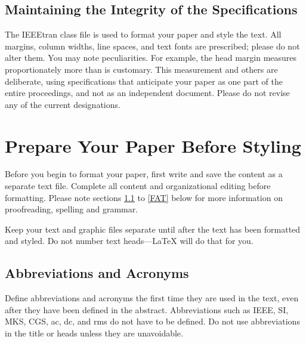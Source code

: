 \documentclass[conference]{IEEEtran}
\begin{document}
    \subsection{Maintaining the Integrity of the Specifications}

    The IEEEtran class file is used to format your paper and style the text. All margins, 
    column widths, line spaces, and text fonts are prescribed; please do not 
    alter them. You may note peculiarities. For example, the head margin
    measures proportionately more than is customary. This measurement 
    and others are deliberate, using specifications that anticipate your paper 
    as one part of the entire proceedings, and not as an independent document. 
    Please do not revise any of the current designations.

    \section{Prepare Your Paper Before Styling}
    Before you begin to format your paper, first write and save the content as a 
    separate text file. Complete all content and organizational editing before 
    formatting. Please note sections \ref{AA} to \ref{FAT} below for more information on 
    proofreading, spelling and grammar.

    Keep your text and graphic files separate until after the text has been 
    formatted and styled. Do not number text heads---{\LaTeX} will do that 
    for you.

    \subsection{Abbreviations and Acronyms}\label{AA}
    Define abbreviations and acronyms the first time they are used in the text, 
    even after they have been defined in the abstract. Abbreviations such as 
    IEEE, SI, MKS, CGS, ac, dc, and rms do not have to be defined. Do not use 
    abbreviations in the title or heads unless they are unavoidable.
\end{document}
